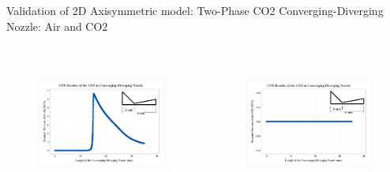 \begin{frame}{Validation of 2D Axisymmetric model: Two-Phase CO2 Converging-Diverging Nozzle: Air and CO2}
 \begin{columns}
    \begin{figure}
        \centering
        \includegraphics[height=4.5cm]{images/co2dynamicpressair.png}
    \end{figure}
  \begin{figure}
        \centering
        \includegraphics[height=4.5cm]{images/co2dynamicpres.png}
    \end{figure}
 \end{columns}
\end{frame}